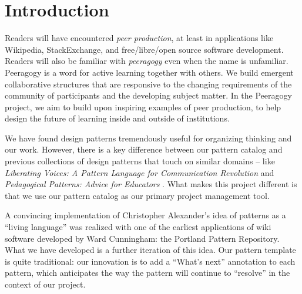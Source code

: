 
\section{Introduction}\label{sec:Introduction}

Readers will have encountered \emph{peer production}, at least in applications like Wikipedia, StackExchange, and free/libre/open source software development.   
%
Readers will also be familiar with \emph{peeragogy} even when the name is unfamiliar.  Peeragogy is a word for active learning together with others. We build emergent collaborative structures that are responsive to the changing requirements of the community of participants and the developing subject matter.
%
In the Peeragogy project,  we aim to build upon inspiring examples of peer production, to help design the future of learning inside and outside of institutions.  



We have found design patterns tremendously useful for organizing thinking and our work.  However, there is a key difference between our pattern catalog and previous collections of design patterns that touch on similar domains -- like \emph{Liberating Voices: A Pattern Language for Communication Revolution} \cite{schuler2008liberating} and \emph{Pedagogical Patterns: Advice for Educators} \cite{bergin2012pedagogical}.
What makes this project different is that we use our pattern catalog as our primary project management tool.



A convincing implementation of Christopher Alexander’s idea of patterns as a ``living language'' \cite[p.~xvii]{alexander1977pattern} was realized with one of the earliest applications of wiki software developed by Ward Cunningham: the Portland Pattern Repository.  What we have developed is a further iteration of this idea.   Our pattern template is quite traditional: our innovation is to add a ``What's next'' annotation to each pattern, which anticipates the way the pattern will continue to ``resolve'' in the context of our project. 


